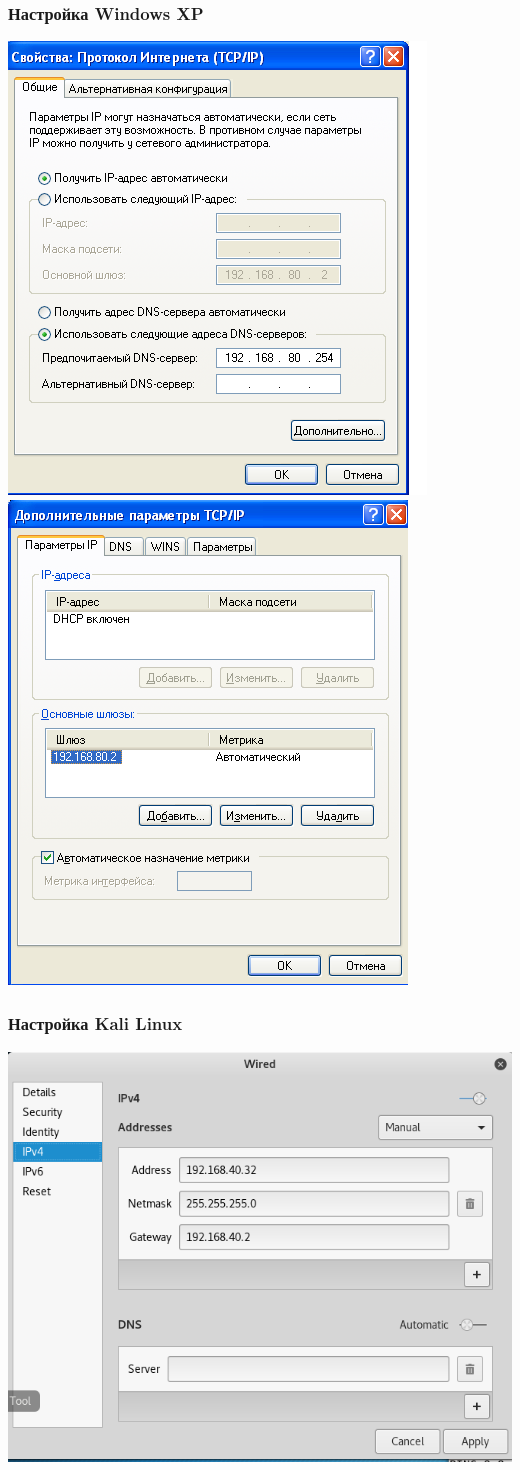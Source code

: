 \documentclass[9pt, compress]{beamer}
\begin{document}
\begin{frame}
\frametitle{Настройка Windows XP}
\begin{center}  
	\includegraphics[width=.52\textwidth]{img/winXp_1}
	\includegraphics[width=.47\textwidth]{img/winXp_2}
\end{center}
\end{frame}

\begin{frame}
\frametitle{Настройка Kali Linux}
\begin{center}  
	\includegraphics[width=.85\textwidth]{img/kali_1}
\end{center}
\end{frame}
\end{document}
